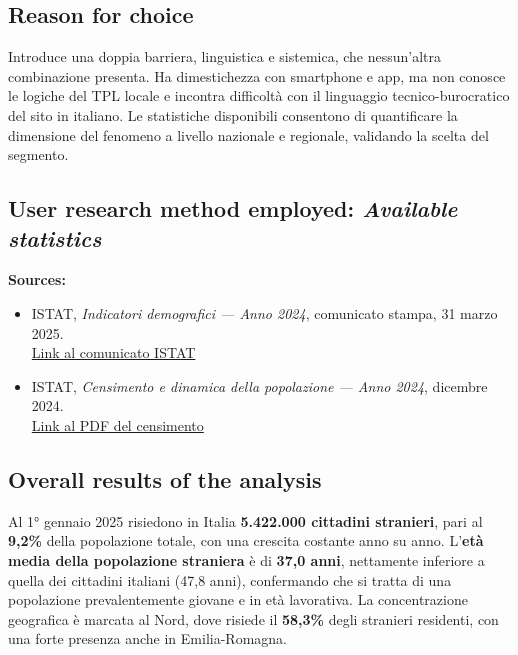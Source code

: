 \documentclass[11pt,a4paper]{article}
\begin{document}
\subsection*{Reason for choice}
\begin{tcolorbox}[colback=backgroundColor,colframe=borderColor,arc=2mm]
Introduce una doppia barriera, linguistica e sistemica, che nessun'altra combinazione presenta. Ha dimestichezza con smartphone e app, ma non conosce le logiche del TPL locale e incontra difficoltà con il linguaggio tecnico-burocratico del sito in italiano. Le statistiche disponibili consentono di quantificare la dimensione del fenomeno a livello nazionale e regionale, validando la scelta del segmento.
\end{tcolorbox}

\subsection*{User research method employed: \textit{Available statistics}}
\begin{tcolorbox}[colback=backgroundColor,colframe=borderColor,arc=2mm]
\textbf{Sources:}
\begin{itemize}[leftmargin=*]
  \item ISTAT, \textit{Indicatori demografici --- Anno 2024},
  comunicato stampa, 31 marzo 2025.\\
  \href{https://www.istat.it/comunicato-stampa/indicatori-demografici-anno-2024/}{Link al comunicato ISTAT}

  \item ISTAT, \textit{Censimento e dinamica della popolazione --- Anno 2024}, dicembre 2024.\\
  \href{https://www.istat.it/wp-content/uploads/2025/12/Censimento-e-dinamica-della-popolazione-Anno-2024.pdf}{Link al PDF del censimento}
\end{itemize}
\end{tcolorbox}

\subsection*{Overall results of the analysis}
\begin{tcolorbox}[colback=backgroundColor,colframe=borderColor,arc=2mm]
Al 1° gennaio 2025 risiedono in Italia \textbf{5.422.000 cittadini
stranieri}, pari al \textbf{9,2\%} della popolazione totale, con una
crescita costante anno su anno.
 L'\textbf{età media della popolazione straniera} è
di \textbf{37,0 anni}, nettamente inferiore a quella dei cittadini
italiani (47,8 anni), confermando che si tratta di una popolazione
prevalentemente giovane e in età lavorativa. La
concentrazione geografica è marcata al Nord, dove risiede il
\textbf{58,3\%} degli stranieri residenti, con una forte presenza
anche in Emilia-Romagna.
\end{tcolorbox}
\end{document}
